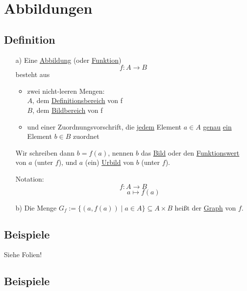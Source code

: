 \documentclass[a4paper, 12pt, twoside] {article}
\begin{document}

\section{Abbildungen}

\subsection{Definition}

\begin{itemize}
\item[a)] Eine \underline{Abbildung} (oder \underline{Funktion})
$$f \colon A \rightarrow B$$ besteht aus
	\begin{itemize}
	\item zwei nicht-leeren Mengen:\\
		$A$, dem \underline{Definitionsbereich} von f \\
		$B$, dem \underline{Bildbereich} von f
	\item und einer Zuordnungsvorschrift, die \underline{jedem} Element 
	$a \in A$ \underline{genau} \underline{ein} Element $b \in B$ zuordnet
	\end{itemize}
	
Wir schreiben dann $b = f(a)$, nennen $b$ das \underline{Bild} oder den \underline{Funktionswert} von $a$ (unter $f$), und $a$ (ein) \underline{Urbild} von $b$ (unter $f$).

Notation:
$$f \colon A \to B$$
$$\qquad\quad a \mapsto f(a)$$

\item[b)] Die Menge $G_f := \{(a,f(a)) \mid a \in A\} \subseteq A \times B$ heißt der \underline{Graph} von $f$.

\end{itemize}

\subsection{Beispiele} Siehe Folien!

\subsection{Beispiele}
\end{document}
